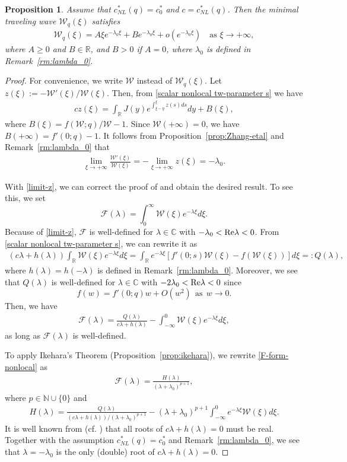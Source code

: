 \documentclass[11pt,a4paper]{article}
\newtheorem{proposition}[theorem]{\textbf{Proposition}}
\numberwithin{equation}{section}
\numberwithin{figure}{section}
\newcommand\bea{\begin{eqnarray}}
\newcommand\eea{\end{eqnarray}}
\newcommand\beaa{\begin{eqnarray*}}
\newcommand\eeaa{\end{eqnarray*}}
\begin{document}
\begin{proposition}\label{prop:correction-U-linear-decay}
Assume that $c_{NL}^*(q)=c^*_0$ and $c=c_{NL}^*(q)$. Then the minimal traveling wave $\mathcal{W}_q(\xi)$ satisfies
\bea\label{decay-U-linear}
\mathcal{W}_q(\xi)=A\xi e^{-\lambda_0\xi}+Be^{-\lambda_0\xi}+o(e^{-\lambda_0\xi})\quad \mbox{as $\xi\to+\infty$},
\eea
where $A\geq0$ and $B\in \mathbb{R}$,
and $B>0$ if $A=0$, where $\lambda_0$ is defined in Remark~\ref{rm:lambda_0}.
\end{proposition}
\begin{proof}
For convenience, we write $\mathcal{W}$ instead of $\mathcal{W}_q(\xi)$.
Let $z(\xi):=-\mathcal{W}'(\xi)/\mathcal{W}(\xi)$. Then, from \eqref{scalar nonlocal tw-parameter s} we have
\beaa
cz(\xi)=\int_{\mathbb{R}}J(y)e^{\int_{\xi-y}^{\xi}z(s)ds}dy+B(\xi),
\eeaa
where $B(\xi)=f(\mathcal{W};q)/\mathcal{W}-1$.
Since $\mathcal{W}(+\infty)=0$, we have $B(+\infty)=f'(0;q)-1$.
It follows from Proposition~\ref{prop:Zhang-etal} and Remark~\ref{rm:lambda_0} that
\bea\label{limit-z}
\lim_{\xi\to+\infty}\frac{\mathcal{W}'(\xi)}{\mathcal{W}(\xi)}=-\lim_{\xi\to+\infty} z(\xi)=-\lambda_0.
\eea

With \eqref{limit-z}, we can correct the proof of \cite[Theorem 1.6]{Coville} and obtain the desired result. To see this, we set 
$$\mathcal{F}(\lambda)=\int_0^{\infty}\mathcal{W}(\xi) e^{-\lambda \xi}d\xi.$$
Because of \eqref{limit-z},
$\mathcal{F}$ is well-defined for $\lambda\in\mathbb{C}$ with $-\lambda_0<{\rm Re}\lambda<0$.
From \eqref{scalar nonlocal tw-parameter s}, we can rewrite it as
\beaa
(c\lambda+h(\lambda))\int_{\mathbb{R}}\mathcal{W}(\xi)e^{-\lambda \xi}d\xi=
\int_{\mathbb{R}} e^{-\lambda \xi}[f'(0;s)\mathcal{W}(\xi)-f(\mathcal{W}(\xi))]d\xi=:Q(\lambda),
\eeaa
where $h(\lambda)=h(-\lambda)$ is defined in Remark~\ref{rm:lambda_0}.
Moreover, we see that $Q(\lambda)$ is well-defined for $\lambda\in\mathbb{C}$ with
$-2\lambda_0<{\rm Re} \lambda<0$
since
$$f(w)=f'(0;q)w+O(w^2)\ \ \text{as}\ \ w\to0.$$
Then, we have
\bea\label{F-form-nonlocal}
\mathcal{F}(\lambda)=\frac{Q(\lambda)}{c\lambda+h(\lambda)}-\int_{-\infty}^{0}\mathcal{W}(\xi)e^{-\lambda \xi}d\xi,
\eea
as long as $\mathcal{F}(\lambda)$ is well-defined.

To apply Ikehara's Theorem (Proposition~\ref{prop:ikehara}), we
rewrite \eqref{F-form-nonlocal} as
\beaa
\mathcal{F}(\lambda)=\frac{H(\lambda)}{(\lambda+\lambda_0)^{p+1}},
\eeaa
where $p\in\mathbb{N}\cup\{0\}$ and
\bea\label{Ikehara-form-nonlocal}
H(\lambda)=\frac{Q(\lambda)}{(c\lambda+h(\lambda))/(\lambda+\lambda_0)^{p+1}}
-(\lambda+\lambda_0)^{p+1}\int_{-\infty}^{0}e^{-\lambda \xi}\mathcal{W}(\xi) d\xi.
\eea
It is well known from (cf. \cite[p.2437]{Carr Chmaj}) that all roots of $c\lambda+h(\lambda)=0$ must be real.  Together with the assumption $c_{NL}^*(q)=c^*_0$ and Remark~\ref{rm:lambda_0},
we see that $\lambda = -\lambda_0$ is the only (double) root of $c\lambda+h(\lambda)=0$.


\end{proof}
\end{document}
